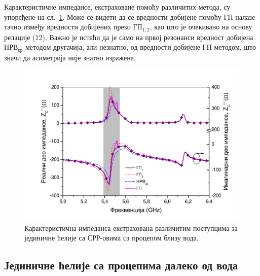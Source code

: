 \documentclass[main.tex]{subfiles}
\begin{document}
Карактеристичне импедансе, екстраховане помоћу различитих метода, су упоређене на сл.~\ref{fig7}. Може се видети да се вредности добијене помоћу $ГП$ налазе тачно између вредности добијених преко $ГП_{1,2}$, као што је очекивано на основу релације (12). Важно је истаћи да је само на првој резонанси вредност добијена $НРВ_{ср}$ методом другачија, али незнатно, од вредности добијене $ГП$ методом, што значи да асиметрија није знатно изражена.
\begin{figure}[!t]
\centering
\includegraphics[scale=\SkalaB]{slike/11a.pdf}
\caption{Карактеристична импеданса екстрахована различитим поступцима за јединичне ћелије са СРР-овима са процепом близу вода.}
\label{fig7}
\end{figure} 

\subsection{Јединичне ћелије са процепима далеко од вода}
\end{document}
